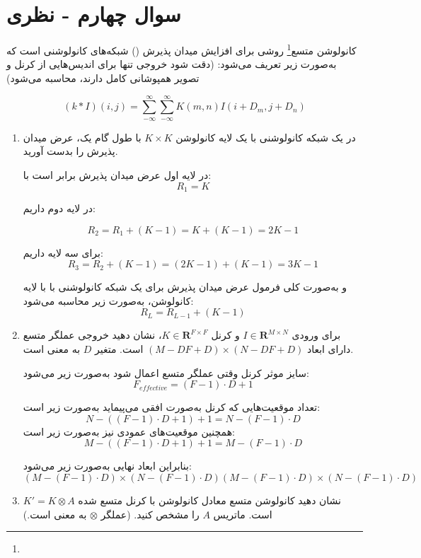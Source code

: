\section{سوال چهارم - نظری}

کانولوشن متسع\footnote{} روشی برای افزایش میدان پذیرش () شبکه‌های کانولوشنی است که به‌صورت زیر تعریف می‌شود: (دقت شود خروجی تنها برای اندیس‌هایی از کرنل و تصویر همپوشانی کامل دارند، محاسبه می‌شود)

$$ (k \ast I)(i, j)=\sum_{-\infty}^{\infty}\sum_{-\infty}^{\infty} K(m,n)I(i+D_m, j+D_n) $$



\begin{enumerate}
	\item در یک شبکه کانولوشنی با یک لایه کانولوشن $K\times K$ با طول گام یک، عرض میدان پذیرش را بدست آورید.
	
	\begin{qsolve}
		
		
		 
		 
		 در لایه اول عرض میدان پذیرش برابر است با:
		 $$ R_1=K $$
		 
		 در لایه دوم داریم:
		 
		 $$ R_2=R_1+(K-1)=K+(K-1)=2K-1 $$
		 
		 برای سه لایه داریم:
		 $$ R_3=R_2+(K-1)=(2K-1)+(K-1)=3K-1$$
		 
		 و به‌صورت کلی فرمول عرض میدان پذیرش برای یک شبکه کانولوشنی با با  لایه کانولوشن، به‌صورت زیر محاسبه می‌شود:
		 $$ R_L=R_{L-1} + (K - 1) $$
	\end{qsolve}
	
	
	
	
	\item برای ورودی 
	$I \in \mathbf{R}^{M\times N}$
	و کرنل
	$K \in \mathbf{R}^{F\times F}$،
		نشان دهید خروجی عملگر متسع دارای ابعاد 
	$(M-DF+D)\times (N-DF+D)$
	است. متغیر $D$ به معنی  است.
	
	
	
	\begin{qsolve}
		سایز موثر کرنل وقتی عملگر متسع اعمال شود به‌صورت زیر می‌شود:
		$$ F_{effective}=(F-1)\cdot D+1 $$
		
		تعداد موقعیت‌هایی که کرنل به‌صورت افقی می‌پیماید به‌صورت زیر است:
		$$ N-((F-1)\cdot D+1)+1=N-(F-1)\cdot D $$
		همچنین موقعیت‌های عمودی نیز به‌صورت زیر است:
		$$ M-((F-1)\cdot D+1)+1=M-(F-1)\cdot D $$
		
		بنابراین ابعاد نهایی به‌صورت زیر می‌شود:
		$$ (M-(F-1)\cdot D)×(N-(F-1)\cdot D)(M-(F-1)\cdot D)\times(N-(F-1)\cdot D) $$
		
	\end{qsolve}
	
	
	
	
	
	
	
	
	\item نشان دهید کانولوشن متسع معادل کانولوشن با کرنل متسع شده 
	$K'=K \otimes A$ 
	است. ماتریس $A$ را مشخص کنید. (عملگر $\otimes$ به معنی   است.)
\end{enumerate}

















